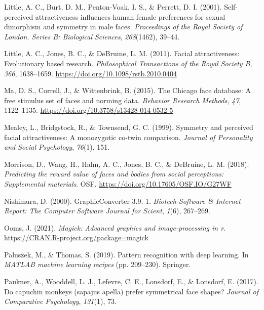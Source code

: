 \documentclass[
  doc,floatsintext]{apa6}
\newlength{\cslhangindent}
\newlength{\cslentryspacingunit} %
\newenvironment{CSLReferences}[2] %
 {%
  \setlength{\parindent}{0pt}
  \ifodd #1
  \let\oldpar\par
  \def\par{\hangindent=\cslhangindent\oldpar}
  \fi
  \setlength{\parskip}{#2\cslentryspacingunit}
 }%
 {}
\begin{document}
\begin{CSLReferences}{1}{0}
\leavevmode{}%
Little, A. C., Burt, D. M., Penton-Voak, I. S., \& Perrett, D. I. (2001). Self-perceived attractiveness influences human female preferences for sexual dimorphism and symmetry in male faces. \emph{Proceedings of the Royal Society of London. Series B: Biological Sciences}, \emph{268}(1462), 39--44.

\leavevmode{}%
Little, A. C., Jones, B. C., \& DeBruine, L. M. (2011). Facial attractiveness: Evolutionary based research. \emph{Philosophical Transactions of the Royal Society B}, \emph{366}, 1638--1659. \url{https://doi.org/10.1098/rstb.2010.0404}

\leavevmode{}%
Ma, D. S., Correll, J., \& Wittenbrink, B. (2015). The {Chicago} face database: A free stimulus set of faces and norming data. \emph{Behavior Research Methods}, \emph{47}, 1122--1135. \url{https://doi.org/10.3758/s13428-014-0532-5}

\leavevmode{}%
Mealey, L., Bridgstock, R., \& Townsend, G. C. (1999). Symmetry and perceived facial attractiveness: A monozygotic co-twin comparison. \emph{Journal of Personality and Social Psychology}, \emph{76}(1), 151.

\leavevmode{}%
Morrison, D., Wang, H., Hahn, A. C., Jones, B. C., \& DeBruine, L. M. (2018). \emph{Predicting the reward value of faces and bodies from social perceptions: Supplemental materials}. OSF. \url{https://doi.org/10.17605/OSF.IO/G27WF}

\leavevmode{}%
Nishimura, D. (2000). GraphicConverter 3.9. 1. \emph{Biotech Software \& Internet Report: The Computer Software Journal for Scient}, \emph{1}(6), 267--269.

\leavevmode{}%
Ooms, J. (2021). \emph{Magick: Advanced graphics and image-processing in r}. \url{https://CRAN.R-project.org/package=magick}

\leavevmode{}%
Paluszek, M., \& Thomas, S. (2019). Pattern recognition with deep learning. In \emph{MATLAB machine learning recipes} (pp. 209--230). Springer.

\leavevmode{}%
Paukner, A., Wooddell, L. J., Lefevre, C. E., Lonsdorf, E., \& Lonsdorf, E. (2017). Do capuchin monkeys (sapajus apella) prefer symmetrical face shapes? \emph{Journal of Comparative Psychology}, \emph{131}(1), 73.


\end{CSLReferences}
\end{document}
